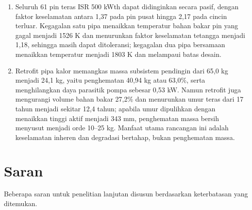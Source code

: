 \documentclass[
  indonesian,
  12pt,
  a4paper,
]{report}
\begin{document}
\begin{enumerate}
  K. Diameter 16 mm gagal memenuhi kriteria (\(SF = 1{,}02\)), sedangkan
  diameter 20 mm menaikkan margin menjadi 1,78 tetapi menambah
  kehilangan bahan bakar dari 26,4\% menjadi 34,0\%.
\item
  Seluruh 61 pin teras ISR 500 kWth dapat didinginkan secara pasif,
  dengan faktor keselamatan antara 1,37 pada pin pusat hingga 2,17 pada
  cincin terluar. Kegagalan satu pipa menaikkan temperatur bahan bakar
  pin yang gagal menjadi 1526 K dan menurunkan faktor keselamatan
  tetangga menjadi 1,18, sehingga masih dapat ditoleransi; kegagalan dua
  pipa bersamaan menaikkan temperatur menjadi 1803 K dan melampaui batas
  desain.
\item
  Retrofit pipa kalor memangkas massa subsistem pendingin dari 65,0 kg
  menjadi 24,1 kg, yaitu penghematan 40,94 kg atau 63,0\%, serta
  menghilangkan daya parasitik pompa sebesar 0,53 kW. Namun retrofit
  juga mengurangi volume bahan bakar 27,2\% dan menurunkan umur teras
  dari 17 tahun menjadi sekitar 12,4 tahun; apabila umur dipulihkan
  dengan menaikkan tinggi aktif menjadi 343 mm, penghematan massa bersih
  menyusut menjadi orde 10--25 kg. Manfaat utama rancangan ini adalah
  keselamatan inheren dan degradasi bertahap, bukan penghematan massa.
\end{enumerate}

\section{Saran}\label{saran}

Beberapa saran untuk penelitian lanjutan disusun berdasarkan
keterbatasan yang ditemukan.
\end{document}
